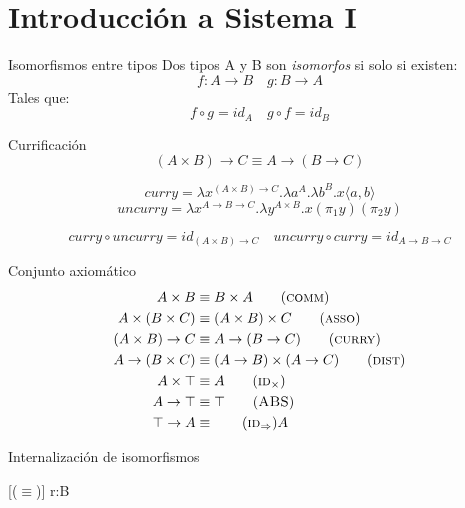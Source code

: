 \documentclass[aspectratio=149]{beamer}
\begin{document}
\section{Introducción a Sistema I}

\begin{frame}{Isomorfismos entre tipos}
	Dos tipos A y B son \textit{isomorfos} si solo si existen:
	\[ f: A \rightarrow B \quad g: B \rightarrow A \]
	Tales que:
	\[ f \circ g = id_A \quad g \circ f = id_B \]
	
	\begin{exampleblock}{Currificación}
		\[ (A \times B) \rightarrow C \equiv A \rightarrow (B \rightarrow C) \]
		
		\[ curry = \lambda x^{(A \times B) \rightarrow C}. \lambda a^A . \lambda b^B . x\langle a,b \rangle \]
		\[ uncurry = \lambda x^{A \rightarrow B \rightarrow C}. \lambda y^{A \times B} . x(\pi_1 y)(\pi_2 y) \]
		
		\[ curry \circ uncurry = id_{(A \times B) \rightarrow C} \quad
		uncurry \circ curry = id_{A \rightarrow B \rightarrow C} \]
	\end{exampleblock}
\end{frame}

\begin{frame}{Conjunto axiomático}
	\begin{align*}
		A \times B &\equiv B \times A \tag{\textsc{comm}} \\
		A \times (B \times C) &\equiv (A \times B) \times C \tag{\textsc{asso}} \\
		(A \times B) \rightarrow C &\equiv A \rightarrow (B \rightarrow C) \tag{\textsc{curry}} \\
		A \rightarrow (B \times C) &\equiv (A \rightarrow B) \times (A \rightarrow C) \tag{\textsc{dist}} \\
		A \times \top &\equiv A \tag{\textsc{id$_\times$}} \\
		A \rightarrow \top &\equiv \top \tag{\textsc{ABS}} \\
		\top \rightarrow A &\equiv \tag{\textsc{id$_\Rightarrow$}} A
	\end{align*}
\end{frame}

\begin{frame}{Internalización de isomorfismos}
	\begin{center}
		\begin{prooftree}
			[($\equiv$)]{ \Gamma \vdash r:B }
		\end{prooftree}
	\end{center}
	
\end{frame}
\end{document}
